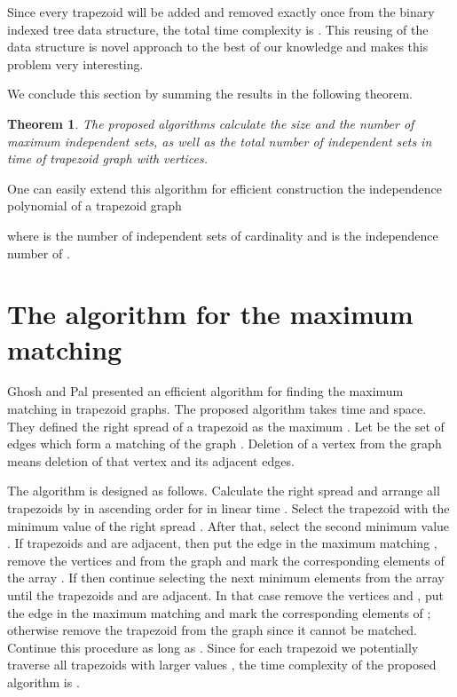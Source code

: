 \documentclass[11pt,letter]{article}
\newtheorem{thm}{Theorem}[section]
\begin{document}
Since every trapezoid will be added and removed exactly once from the binary indexed tree data
structure, the total time complexity is . This reusing of the data structure is novel
approach to the best of our knowledge and makes this problem very interesting.
\medskip

We conclude this section by summing the results in the following theorem.

\begin{thm}
The proposed algorithms calculate the size and the number of maximum independent sets, as well as
the total number of independent sets in time  of trapezoid graph  with 
vertices.
\end{thm}

One can easily extend this algorithm for efficient construction the independence polynomial of a
trapezoid graph

where  is the number of independent sets of cardinality  and  is the
independence number of .


\section{The algorithm for the maximum matching}

Ghosh and Pal \cite{GhPa05} presented an efficient algorithm for finding the maximum matching in
trapezoid graphs. The proposed algorithm takes  time and  space. They defined the
right spread  of a trapezoid  as the maximum . Let  be the
set of edges which form a matching of the graph . Deletion of a vertex from the graph means
deletion of that vertex and its adjacent edges.

The algorithm is designed as follows. Calculate the right spread  and arrange all trapezoids
by  in ascending order for  in linear time . Select the trapezoid 
with the minimum value of the right spread . After that, select the second minimum value . If trapezoids  and  are adjacent, then put the edge  in the maximum
matching , remove the vertices  and  from the graph  and mark the corresponding
elements of the array . If  then continue selecting the next minimum
elements  from the array  until the trapezoids  and  are adjacent. In that case
remove the vertices  and , put the edge  in the maximum matching  and mark the
corresponding elements of ; otherwise remove the trapezoid  from the graph  since it
cannot be matched. Continue this procedure as long as . Since for each trapezoid we
potentially traverse all trapezoids with larger values , the time complexity of the proposed
algorithm is .
\end{document}
